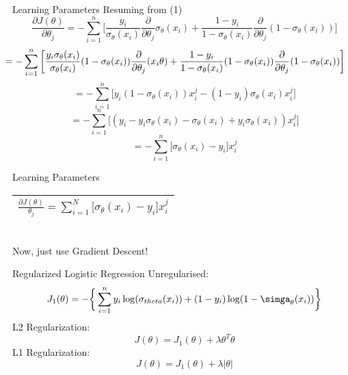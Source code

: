 \documentclass{beamer}
\begin{document}
	\begin{frame}{Learning Parameters}
	    Resuming from (1)
	    \begin{equation*}
	        \frac{\partial J(\theta)}{\partial \theta_{j}} = -\sum_{i=1}^{n}\bigg[\frac{y_{i}}{\sigma_{\theta}(x_{i})} \frac{\partial}{\partial \theta_{j}} \sigma_{\theta}(x_{i}) + \frac{1 - y_{i}}{1 - \sigma_{\theta}(x_{i})} \frac{\partial}{\partial \theta_{j}}(1 - \sigma_{\theta}(x_{i}))\bigg]
	    \end{equation*}
	    \begin{equation*}
	        \hspace{-0.7cm}= -\sum_{i=1}^{n}\bigg[\frac{y_{i}\sigma_{\theta}(x_{i})}{\sigma_{\theta}(x_{i})}(1 - \sigma_{\theta}(x_{i}))\frac{\partial}{\partial \theta_{j}} (x_{i}\theta) + \frac{1 - y_{i}}{1 - \sigma_{\theta}(x_{i})}(1 - \sigma_{\theta}(x_{i})) \frac{\partial}{\partial \theta_{j}}(1 - \sigma_{\theta}(x_{i}))\bigg]
	    \end{equation*}
	    \begin{equation*}
	        = -\sum_{i=1}^{n}\bigg[y_{i}(1 - \sigma_{\theta}(x_{i}))x_{i}^{j} - (1 - y_{i})\sigma_{\theta}(x_{i})x_{i}^{j}\bigg]
	    \end{equation*}
	    \begin{equation*}
	        = -\sum_{i=1}^{n}\bigg[(y_{i} - y_{i}\sigma_{\theta}(x_{i}) - \sigma_{\theta}(x_{i}) + y_{i}\sigma_{\theta}(x_{i}))x_{i}^{j}\bigg]
	    \end{equation*}
	    \begin{equation*}
	        = -\sum_{i=1}^{n}\bigg[\sigma_{\theta}(x_{i}) - y_{i}\bigg]x_{i}^{j}
	    \end{equation*}
	\end{frame}
	\begin{frame}{Learning Parameters}
	\centering
	  \begin{tabular}{|c|} \hline
        $\frac{\partial J(\theta)}{\theta_{j}} = \sum_{i=1}^{N}\big[\sigma_{\theta}(x_{i}) - y_{i}\big]x_{i}^{j}$\\ \hline
      \end{tabular}\\
      Now, just use Gradient Descent!
	\end{frame}
	\begin{frame}{Regularized Logistic Regression}
	    Unregularised:
	    \begin{equation*}
	        J_{1}(\theta) = -\bigg\{\sum_{i=1}^{n}y_{i}\log(\sigma_{theta}(x_{i})) + (1 - y_{i})\log(1 - \simga_{\theta}(x_{i}))\bigg\}
	    \end{equation*}
	    L2 Regularization:
	    \begin{equation*}
	        J(\theta) = J_{1}(\theta) + \lambda\theta^{T}\theta
	    \end{equation*}
	    L1 Regularization:
	    \begin{equation*}
	        J(\theta) = J_{1}(\theta) + \lambda|\theta|
	    \end{equation*}
	\end{frame}
\end{document}
